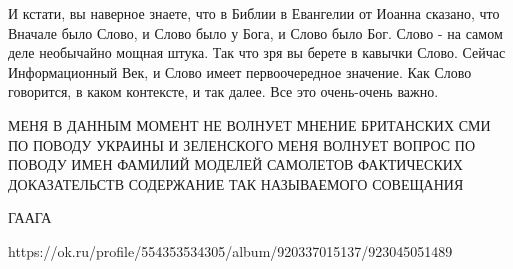  
 
 
 
 







И кстати, вы наверное знаете, что в Библии в Евангелии от Иоанна сказано, что
Вначале было Слово, и Слово было у Бога, и Слово было Бог. Слово - на самом
деле необычайно мощная штука. Так что зря вы берете в кавычки Слово. Сейчас
Информационный Век, и Слово имеет первоочередное значение. Как Слово говорится,
в каком контексте, и так далее. Все это очень-очень важно.


МЕНЯ В ДАННЫМ МОМЕНТ НЕ ВОЛНУЕТ МНЕНИЕ БРИТАНСКИХ СМИ ПО ПОВОДУ УКРАИНЫ И
ЗЕЛЕНСКОГО МЕНЯ ВОЛНУЕТ ВОПРОС ПО ПОВОДУ ИМЕН ФАМИЛИЙ МОДЕЛЕЙ САМОЛЕТОВ
ФАКТИЧЕСКИХ ДОКАЗАТЕЛЬСТВ СОДЕРЖАНИЕ ТАК НАЗЫВАЕМОГО СОВЕЩАНИЯ

ГААГА

https://ok.ru/profile/554353534305/album/920337015137/923045051489

